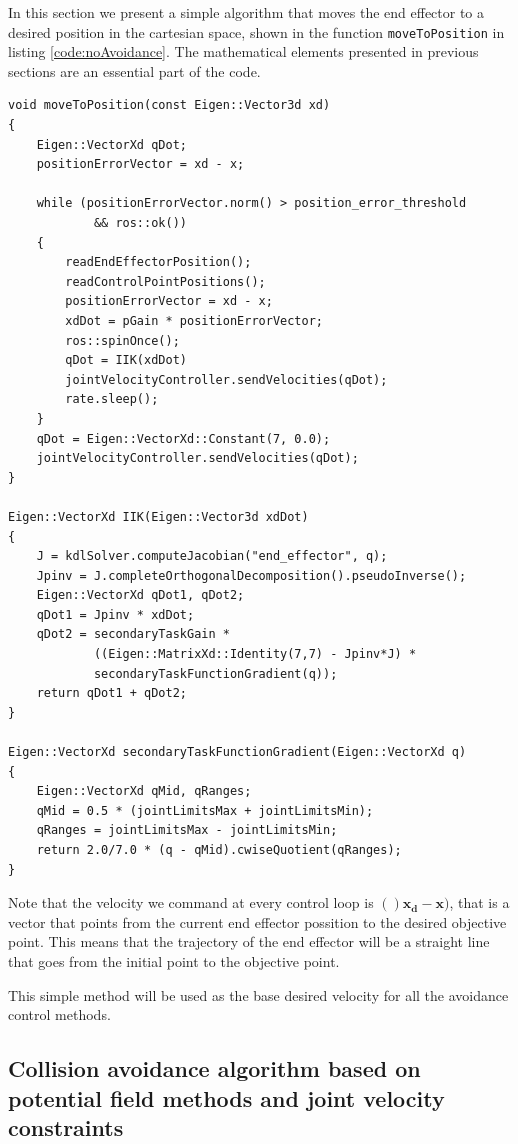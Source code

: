 In this section we present a simple algorithm that moves the end effector to a desired position in the cartesian space, shown in the function \lstinline[columns=fixed]{moveToPosition} in listing \ref{code:noAvoidance}. The mathematical elements presented in previous sections are an essential part of the code.

\begin{lstlisting}[caption={CartesianPositionController.cpp},captionpos=b, label={code:noAvoidance}]
void moveToPosition(const Eigen::Vector3d xd)
{
    Eigen::VectorXd qDot;
    positionErrorVector = xd - x;

    while (positionErrorVector.norm() > position_error_threshold
            && ros::ok())
    {
        readEndEffectorPosition();
        readControlPointPositions();
        positionErrorVector = xd - x;
        xdDot = pGain * positionErrorVector;
        ros::spinOnce();
        qDot = IIK(xdDot)
        jointVelocityController.sendVelocities(qDot);
        rate.sleep();
    }
    qDot = Eigen::VectorXd::Constant(7, 0.0);
    jointVelocityController.sendVelocities(qDot);
}

Eigen::VectorXd IIK(Eigen::Vector3d xdDot)
{
    J = kdlSolver.computeJacobian("end_effector", q);
    Jpinv = J.completeOrthogonalDecomposition().pseudoInverse();
    Eigen::VectorXd qDot1, qDot2;
    qDot1 = Jpinv * xdDot;
    qDot2 = secondaryTaskGain *
            ((Eigen::MatrixXd::Identity(7,7) - Jpinv*J) *
            secondaryTaskFunctionGradient(q));
    return qDot1 + qDot2;
}

Eigen::VectorXd secondaryTaskFunctionGradient(Eigen::VectorXd q)
{
    Eigen::VectorXd qMid, qRanges;
    qMid = 0.5 * (jointLimitsMax + jointLimitsMin);
    qRanges = jointLimitsMax - jointLimitsMin;
    return 2.0/7.0 * (q - qMid).cwiseQuotient(qRanges);
}
\end{lstlisting}

Note that the velocity we command at every control loop is $()\mathbf{x_d} - \mathbf{x})$, that is a vector that points from the current end effector possition to the desired objective point. This means that the trajectory of the end effector will be a straight line that goes from the initial point to the objective point.

This simple method will be used as the base desired velocity for all the avoidance control methods.

\subsection{Collision avoidance algorithm based on potential field methods and joint velocity constraints}
\label{ss:flacco}

